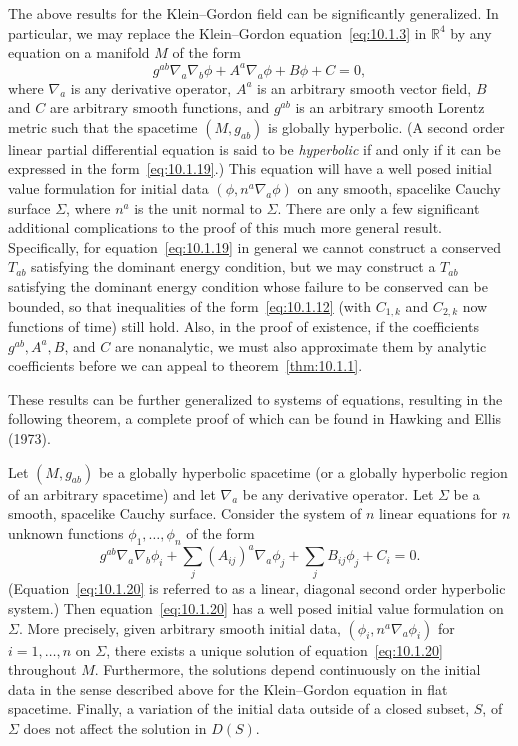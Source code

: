The above results for the Klein--Gordon field can be significantly generalized. In
particular, we may replace the Klein--Gordon equation~\eqref{eq:10.1.3} in
\(\mathbb R^4\) by any equation on a manifold \(M\) of the form
\begin{equation}
  g^{ab}\nabla_a\nabla_b\phi+A^a\nabla_a\phi+B\phi+C=0,
  \tag{10.1.19}\label{eq:10.1.19}
\end{equation}
where \(\nabla_a\) is any derivative operator, \(A^a\) is an arbitrary smooth vector
field, \(B\) and \(C\) are arbitrary smooth functions, and \(g^{ab}\) is an arbitrary
smooth Lorentz metric such that the spacetime \((M,g_{ab})\) is globally hyperbolic.
(A second order linear partial differential equation is said to be \emph{hyperbolic} if
and only if it can be expressed in the form~\eqref{eq:10.1.19}.) This equation will
have a well posed initial value formulation for initial data
\((\phi,n^a\nabla_a\phi)\) on any smooth, spacelike Cauchy surface \(\Sigma\), where
\(n^a\) is the unit normal to \(\Sigma\). There are only a few significant additional
complications to the proof of this much more general result. Specifically, for
equation~\eqref{eq:10.1.19} in general we cannot construct a conserved \(T_{ab}\)
satisfying the dominant energy condition, but we may construct a \(T_{ab}\) satisfying
the dominant energy condition whose failure to be conserved can be bounded, so that
inequalities of the form~\eqref{eq:10.1.12} (with \(C_{1,k}\) and \(C_{2,k}\) now
functions of time) still hold. Also, in the proof of existence, if the coefficients
\(g^{ab},A^a,B\), and \(C\) are nonanalytic, we must also approximate them by
analytic coefficients before we can appeal to theorem~\ref{thm:10.1.1}.

These results can be further generalized to systems of equations, resulting in the
following theorem, a complete proof of which can be found in Hawking and Ellis
(1973).

\begin{theorem}\label{thm:10.1.2}
Let \((M,g_{ab})\) be a globally hyperbolic spacetime (or a globally hyperbolic region
of an arbitrary spacetime) and let \(\nabla_a\) be any derivative operator. Let
\(\Sigma\) be a smooth, spacelike Cauchy surface. Consider the system of \(n\) linear
equations for \(n\) unknown functions \(\phi_1,\ldots,\phi_n\) of the form
\begin{equation}
  g^{ab}\nabla_a\nabla_b\phi_i
  +\sum_j(A_{ij})^a\nabla_a\phi_j
  +\sum_jB_{ij}\phi_j+C_i=0.
  \tag{10.1.20}\label{eq:10.1.20}
\end{equation}
(Equation~\eqref{eq:10.1.20} is referred to as a linear, diagonal second order
hyperbolic system.) Then equation~\eqref{eq:10.1.20} has a well posed initial value
formulation on \(\Sigma\). More precisely, given arbitrary smooth initial data,
\((\phi_i,n^a\nabla_a\phi_i)\) for \(i=1,\ldots,n\) on \(\Sigma\), there exists a
unique solution of equation~\eqref{eq:10.1.20} throughout \(M\). Furthermore, the
solutions depend continuously on the initial data in the sense described above for the
Klein--Gordon equation in flat spacetime. Finally, a variation of the initial data
outside of a closed subset, \(S\), of \(\Sigma\) does not affect the solution in \(D(S)\).
\end{theorem}

